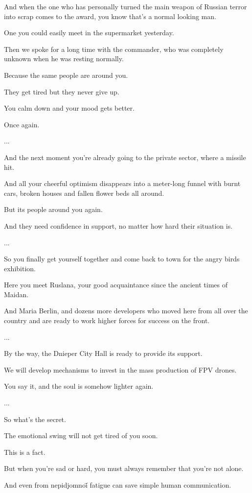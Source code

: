 And when the one who has personally turned the main weapon of Russian terror into scrap comes to the award, you know that's a normal looking man.\par
One you could easily meet in the supermarket yesterday.\par
Then we spoke for a long time with the commander, who was completely unknown when he was resting normally.\par
Because the same people are around you.\par
They get tired but they never give up.\par
You calm down and your mood gets better.\par
Once again.\par
...\par
And the next moment you're already going to the private sector, where a missile hit.\par
And all your cheerful optimism disappears into a meter-long funnel with burnt cars, broken houses and fallen flower beds all around.\par
But its people around you again.\par
And they need confidence in support, no matter how hard their situation is.\par
...\par
So you finally get yourself together and come back to town for the angry birds exhibition.\par
Here you meet Ruslana, your good acquaintance since the ancient times of Maidan.\par
And Maria Berlin, and dozens more developers who moved here from all over the country and are ready to work higher forces for success on the front.\par
...\par
By the way, the Dnieper City Hall is ready to provide its support.\par
We will develop mechanisms to invest in the mass production of FPV drones.\par
You say it, and the soul is somehow lighter again.\par
...\par
So what's the secret.\par
The emotional swing will not get tired of you soon.\par
This is a fact.\par
But when you're sad or hard, you must always remember that you're not alone.\par
And even from nepidjomnoí̈ fatigue can save simple human communication.\par
